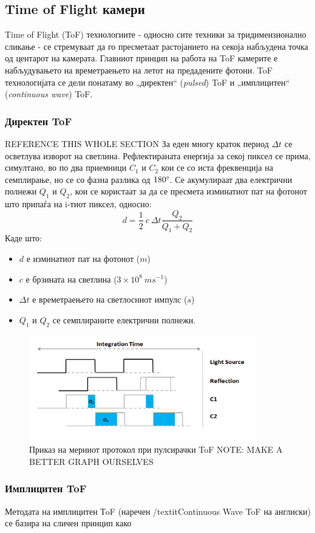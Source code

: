 \documentclass{article}
\begin{document}
	\subsection{Time of Flight камери}
		Time of Flight (ToF) технологиите - односно сите техники за тридимензионално сликање - се стремуваат да го пресметаат растојанието на секоја набљудена точка од центарот на камерата. Главниот принцип на работа на ToF камерите е набљудувањето на времетраењето на летот на предадените фотони. ToF технологијата се дели понатаму во „директен“ (\textit{pulsed}) ToF и „имплицитен“ (\textit{continuous wave}) ToF.
	\subsubsection{Директен ToF}
		REFERENCE THIS WHOLE SECTION
		За еден многу краток период $ \Delta t $ се осветлува изворот на светлина. Рефлектираната енергија за секој пиксел се прима, симултано, во по два приемници $C_1$ и $C_2$ кои се со иста фреквенција на семплирање, но се со фазна разлика од $180 \degree$. Се акумулираат два електрични полнежи $Q_1$ и  $Q_2$, кои се користаат за да се пресмета изминатиот пат на фотонот што припаѓа на i-тиот пиксел, односно:
		$$ d = \frac{1}{2} \ c\  \Delta t \frac{Q_2}{Q_1 + Q_2} $$
		Каде што:
		\begin{itemize}
			\item $d$ е изминатиот пат на фотонот ($m$)
			\item $c$ е брзината на светлина ($ 3 \times 10^8\ ms^{-1} $)
			\item $\Delta t$ е времетраењето на светлосниот импулс ($s$)
			\item $Q_1$ и $Q_2$ се семплираните електрични полнежи.
			\end{itemize}

			\begin{figure}[H]
				\includegraphics[width=0.5\linewidth]{./images/impulseToF.png}
				\centering
				\caption{Приказ на мерниот протокол при пулсирачки ToF NOTE: MAKE A BETTER GRAPH OURSELVES}
				\label{fig:impulseToF.png}
				\end{figure}

	\subsubsection{Имплицитен ToF}
Методата на имплицитен ТoF (наречен /textit{Continuous Wave ToF} на англиски) се базира на сличен принцип како
\end{document}
